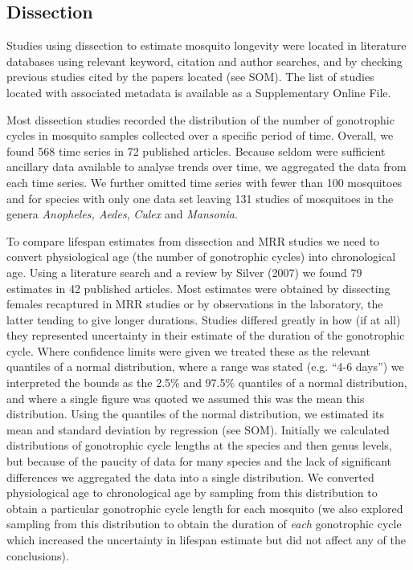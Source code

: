 \documentclass[]{article}
\begin{document}
\subsection{Dissection}\label{dissection}

Studies using dissection to estimate mosquito longevity were located in
literature databases using relevant keyword, citation and author
searches, and by checking previous studies cited by the papers located
(see SOM). The list of studies located with associated metadata is
available as a Supplementary Online File.

Most dissection studies recorded the distribution of the number of
gonotrophic cycles in mosquito samples collected over a specific period
of time. Overall, we found 568 time series in 72 published articles.
Because seldom were sufficient ancillary data available to analyse
trends over time, we aggregated the data from each time series. We
further omitted time series with fewer than 100 mosquitoes and for
species with only one data set leaving 131 studies of mosquitoes in the
genera \emph{Anopheles, Aedes}, \emph{Culex} and \emph{Mansonia}.

To compare lifespan estimates from dissection and MRR studies we need to
convert physiological age (the number of gonotrophic cycles) into
chronological age. Using a literature search and a review by Silver
(2007) we found 79 estimates in 42 published articles. Most estimates
were obtained by dissecting females recaptured in MRR studies or by
observations in the laboratory, the latter tending to give longer
durations. Studies differed greatly in how (if at all) they represented
uncertainty in their estimate of the duration of the gonotrophic cycle.
Where confidence limits were given we treated these as the relevant
quantiles of a normal distribution, where a range was stated (e.g. ``4-6
days'') we interpreted the bounds as the 2.5\% and 97.5\% quantiles of a
normal distribution, and where a single figure was quoted we assumed
this was the mean this distribution. Using the quantiles of the normal
distribution, we estimated its mean and standard deviation by regression
(see SOM). Initially we calculated distributions of gonotrophic cycle
lengths at the species and then genus levels, but because of the paucity
of data for many species and the lack of significant differences we
aggregated the data into a single distribution. We converted
physiological age to chronological age by sampling from this
distribution to obtain a particular gonotrophic cycle length for each
mosquito (we also explored sampling from this distribution to obtain the
duration of \emph{each} gonotrophic cycle which increased the
uncertainty in lifespan estimate but did not affect any of the
conclusions).
\end{document}
